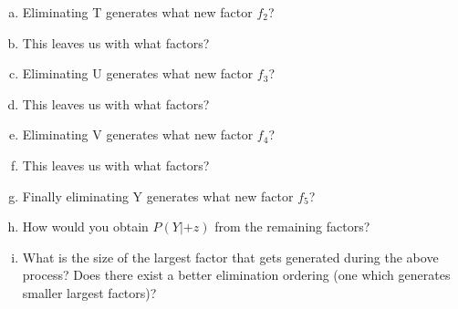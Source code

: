 \documentclass[11pt]{article}
\newif\ifsol
\begin{document}
\begin{enumerate}
\begin{enumerate}[a)]
        \fi
        \item Eliminating T generates what new factor $f_2$?\\
        \ifsol
            {\color{blue} $f_2(U,V,W,+z) =  \sum_t P(t)P(U|t)P(V |t)P(W|t)f_1(t,+z)$}
        \else
            \vspace{1pt}
        \fi
        \item This leaves us with what factors?\\
        \ifsol
            {\color{blue} $P(Y|V,W),f_2(U,V,W,+z)$}
        \else
            \vspace{1pt}
        \fi
        \item Eliminating U generates what new factor $f_3$?\\
        \ifsol
            {\color{blue} $f_3(V,W,+z) = \sum_u f_2(u,V,W,+z)$}
        \else
            \vspace{1pt}
        \fi
        \item This leaves us with what factors?\\
        \ifsol
            {\color{blue} $P(Y|V,W),f_3(V,W,+z)$}
        \else
            \vspace{1pt}
        \fi
        \item Eliminating V generates what new factor $f_4$?\\
        \ifsol
            {\color{blue} $f_4(W, Y, +z) =  \sum_v f_3(v, W, +z)P (Y |v, W )$}
        \else
            \vspace{1pt}
        \fi
        \item This leaves us with what factors?\\
        \ifsol
            {\color{blue} $f_4(W,Y,+z)$}
        \else
            \vspace{1pt}
        \fi
        \item Finally eliminating Y generates what new factor $f_5$?\\
        \ifsol
            {\color{blue} $f_5(Y, +z) =  \sum_w f_4(w, Y, +z)$}
        \else
            \vspace{1pt}
        \fi
        \item How would you obtain $P(Y | +z)$ from the remaining factors?\\
        \ifsol
            {\color{blue} Well we only have one factor left so simply renormalize $f_5(Y, +z)$ to obtain $P (Y | +z)$. $$P(y|+z)= \frac{f_5(y,+z)}{\sum_{y'} f_5(y',+z)}$$}
        \else
            \vspace{2pt}
        \fi
        \item What is the size of the largest factor that gets generated during the above process? Does there exist a better elimination ordering (one which generates smaller largest factors)?\\

\end{enumerate}
\end{enumerate}
\end{document}
